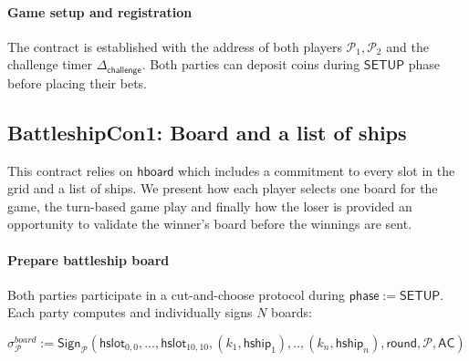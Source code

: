 \documentclass{llncs}
\newcommand{\gamestatus}{\mathsf{phase}}
\newcommand{\gamesetup}{\mathsf{SETUP}}
\newcommand{\hboard}{\mathsf{hboard}}
\newcommand{\hslot}{\mathsf{hslot}}
\newcommand{\hship}{\mathsf{hship}}
\newcommand{\participant}{\mathcal{P}}
\newcommand{\sign}{\mathsf{Sign}}
\newcommand{\appcontract}{\mathsf{AC}}
\newcommand{\timerchallenge}{\mathsf{\Delta}_{\mathsf{challenge}}}
\begin{document}


\paragraph{Game setup and registration} 
The contract is established with the address of both players $\participant_{1},\participant_{2}$ and the challenge timer $\timerchallenge$. 
Both parties can deposit coins during $\gamesetup$ phase before placing their bets. 


\subsection{BattleshipCon1: Board and  a list of ships } 

This contract relies on $\hboard$ which includes a commitment to every slot in the grid and a list of ships. 
We present how each player selects one board for the game, the turn-based game play and finally how the loser is provided an opportunity to validate the winner's board before the winnings are sent. 

\paragraph{Prepare battleship board} Both parties participate in a cut-and-choose protocol during $\gamestatus := \gamesetup$. 
Each party computes and individually signs $N$ boards: 

\begin{center}
	$\sigma^{board}_{\participant} := \sign_{\participant}(\hslot_{0,0},...,\hslot_{10,10},(k_{1},\hship_{1}),..,(k_{n},\hship_{n}), \mathsf{round}, \participant, \appcontract)$
\end{center}
\end{document}

